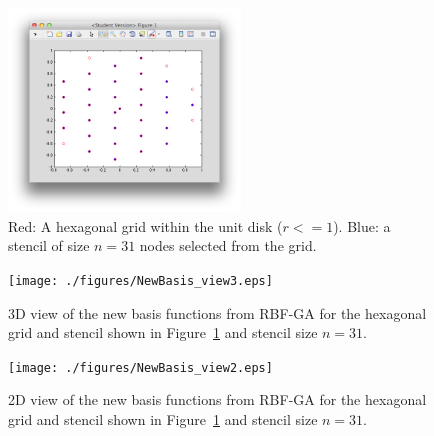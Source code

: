 \documentclass[11pt]{report}
\begin{document}
\begin{figure}
\centering
\includegraphics[width=0.55\textwidth]{./figures/hex_grid_stencil.png}
\caption{Red: A hexagonal grid within the unit disk ($r <= 1$). Blue: a stencil of size $n=31$ nodes selected from the grid. }
\label{fig:hex_grid_stencil}
\end{figure}

\begin{figure}
\centering
{\textwidth
\texttt{[image: ./figures/NewBasis\_view3.eps]}}
\caption{3D view of the new basis functions from RBF-GA for the hexagonal grid and stencil shown in Figure~\ref{fig:hex_grid_stencil} and stencil size $n=31$.}
\label{fig:psis_3d}
\end{figure}

\begin{figure}
\centering
{\textwidth
\texttt{[image: ./figures/NewBasis\_view2.eps]}}
\caption{2D view of the new basis functions from RBF-GA for the hexagonal grid and stencil shown in Figure~\ref{fig:hex_grid_stencil} and stencil size $n=31$.}
\label{fig:psis_2d}
\end{figure}


\ifstandalone


\end{document}
